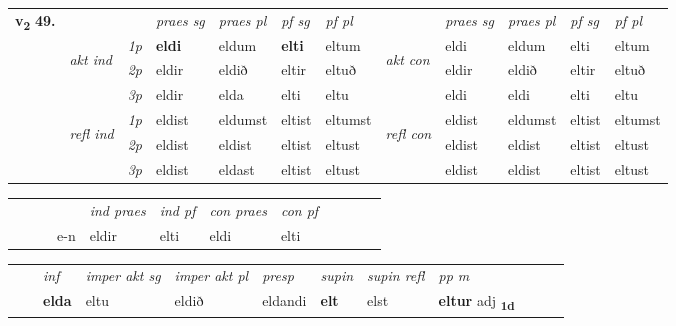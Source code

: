 \begin{tabular}{llllllllllll} \toprule
\multirow{4}{*}{{{\textbf{v{\textsubscript{2}}} \Large{\textbf{49.}}}}}  & &   &  \textit{praes sg}  & \textit{praes pl}  &\textit{ pf sg} & \textit{pf pl} &  &  \textit{praes sg}  & \textit{praes pl}  & \textit{pf sg} & \textit{pf pl } \\*
	\cmidrule{4-7} \cmidrule{9-12}
 & \multirow{3}{*}{\begin{turn}{90}\textit{akt ind}\end{turn}} & {\textit{1p}} & \textbf{eldi} & eldum    & \textbf{elti} & eltum & \multirow{3}{*}{\begin{turn}{90}\textit{akt con}\end{turn}} &eldi & eldum & elti & eltum\\*
& &  {\textit{2p}} &  eldir  & eldið   & eltir & eltuð & & eldir & eldið & eltir & eltuð \\*
& &  {\textit{3p}} & eldir & elda   & elti & eltu & & eldi & eldi& elti & eltu  \\*
\cmidrule{4-7} \cmidrule{9-12}
 &\multirow{3}{*}{\begin{turn}{90}\textit{refl ind}\end{turn}} & {\textit{1p}} & eldist & eldumst    & eltist & eltumst & \multirow{3}{*}{\begin{turn}{90}\textit{refl con}\end{turn}}  &eldist & eldumst & eltist & eltumst\\*
 &&  {\textit{2p}} &  eldist  & eldist   & eltist & eltust & &eldist & eldist & eltist & eltust \\*
& &  {\textit{3p}} & eldist & eldast   & eltist & eltust & & eldist & eldist& eltist & eltust  \\*
\cmidrule{4-7} \cmidrule{9-12}
\end{tabular}


\begin{tabular}{llllllllllll}
 & &  & &  \textit{ind praes} & \textit{ind pf} & \textit{con praes} & \textit{con pf} \\*
&  & & e-n & eldir & elti & eldi & elti \\*
\cmidrule{5-9}
\end{tabular}


\begin{tabular}{llllllllllll}
 & & \textit{inf} & \textit{imper akt sg} & \textit{imper akt pl}   & \textit{presp} & \textit{supin} & \textit{supin refl} & \textit{pp m}     \\*
  & & \textbf{elda} & eltu  & eldið   & eldandi &  \textbf{elt} & elst & \textbf{eltur} adj \textbf{\textsubscript{1d}} \\*
\cmidrule{1-12}
\end{tabular}



